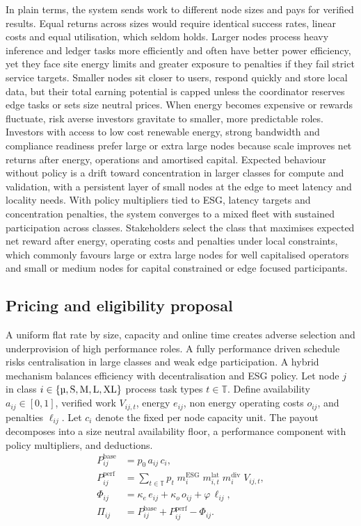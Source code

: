\documentclass[oneside,10pt]{swissi}
\begin{document}
In plain terms, the system sends work to different node sizes and pays for verified results. Equal returns across sizes would require identical success rates, linear costs and equal utilisation, which seldom holds. Larger nodes process heavy inference and ledger tasks more efficiently and often have better power efficiency, yet they face site energy limits and greater exposure to penalties if they fail strict service targets. Smaller nodes sit closer to users, respond quickly and store local data, but their total earning potential is capped unless the coordinator reserves edge tasks or sets size neutral prices. When energy becomes expensive or rewards fluctuate, risk averse investors gravitate to smaller, more predictable roles. Investors with access to low cost renewable energy, strong bandwidth and compliance readiness prefer large or extra large nodes because scale improves net returns after energy, operations and amortised capital. Expected behaviour without policy is a drift toward concentration in larger classes for compute and validation, with a persistent layer of small nodes at the edge to meet latency and locality needs. With policy multipliers tied to ESG, latency targets and concentration penalties, the system converges to a mixed fleet with sustained participation across classes. Stakeholders select the class that maximises expected net reward after energy, operating costs and penalties under local constraints, which commonly favours large or extra large nodes for well capitalised operators and small or medium nodes for capital constrained or edge focused participants.\\

\subsection{Pricing and eligibility proposal}

A uniform flat rate by size, capacity and online time creates adverse selection and underprovision of high performance roles. A fully performance driven schedule risks centralisation in large classes and weak edge participation. A hybrid mechanism balances efficiency with decentralisation and ESG policy. Let node \(j\) in class \(i\in\{\text{\textmu},\mathrm{S},\mathrm{M},\mathrm{L},\mathrm{XL}\}\) process task types \(t\in\mathbb{T}\). Define availability \(a_{ij}\in[0,1]\), verified work \(V_{ij,t}\), energy \(e_{ij}\), non energy operating costs \(o_{ij}\), and penalties \(\ell_{ij}\). Let \(c_i\) denote the fixed per node capacity unit. The payout decomposes into a size neutral availability floor, a performance component with policy multipliers, and deductions.
\begin{align}
P^{\mathrm{base}}_{ij} &= p_0\, a_{ij}\, c_i, \label{eq:base}\\[3pt]
P^{\mathrm{perf}}_{ij} &= \sum_{t\in\mathbb{T}} p_t\; m^{\mathrm{ESG}}_{i}\; m^{\mathrm{lat}}_{i,t}\; m^{\mathrm{div}}_{i}\; V_{ij,t}, \label{eq:perf}\\[3pt]
\Phi_{ij} &= \kappa_e\, e_{ij} + \kappa_o\, o_{ij} + \varphi\, \ell_{ij}, \label{eq:deductions}\\[3pt]
\Pi_{ij} &= P^{\mathrm{base}}_{ij} + P^{\mathrm{perf}}_{ij} - \Phi_{ij}. \label{eq:net}
\end{align}
\end{document}
